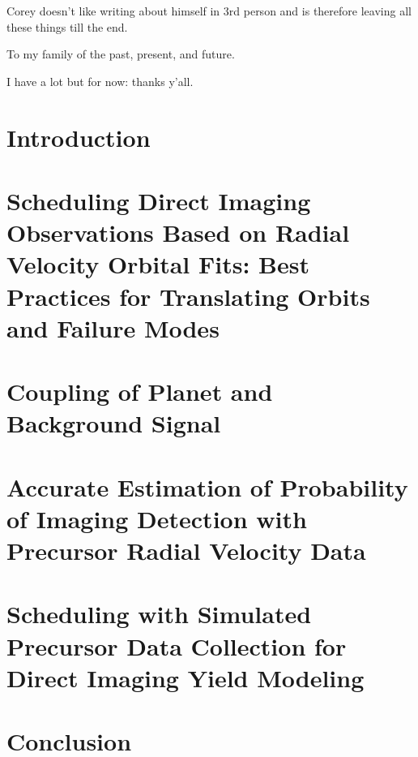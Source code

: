 \documentclass[phd,tocprelim]{cornell}
\begin{document}
\begin{abstract}
\end{abstract}

\begin{biosketch}
Corey doesn't like writing about himself in 3rd person and is therefore leaving
all these things till the end.
\end{biosketch}

\begin{dedication}
To my family of the past, present, and future.
\end{dedication}

\begin{acknowledgements}
I have a lot but for now: thanks y'all.
\end{acknowledgements}

\contentspage
\tablelistpage
\figurelistpage

\normalspacing \setcounter{page}{1} 
\pagestyle{cornell} \addtolength{\parskip}{0.5\baselineskip}

\chapter{Introduction}
\label{cha:intro}


\chapter{Scheduling Direct Imaging Observations Based on Radial Velocity Orbital Fits: Best Practices for Translating Orbits and Failure Modes}
\label{cha:first_paper}


\chapter{Coupling of Planet and Background Signal}
\label{cha:coupling}


\chapter{Accurate Estimation of Probability of Imaging Detection with Precursor Radial Velocity Data}
\label{cha:accurate_pdet}


\chapter{Scheduling with Simulated Precursor Data Collection for Direct Imaging Yield Modeling}
\label{cha:sim_and_scheduling}


\chapter{Conclusion}
\label{cha:conclusion}



\appendix


\end{document}
